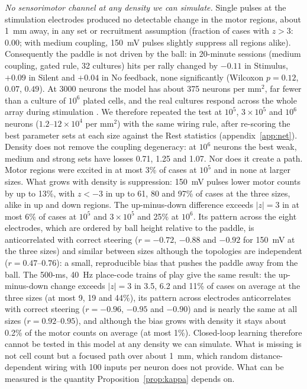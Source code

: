\documentclass[12pt]{article}
\numberwithin{equation}{section}
\begin{document}
\emph{No sensorimotor channel at any density we can simulate.} Single pulses at the stimulation electrodes produced no detectable change in the motor regions, about 1~mm away, in any set or recruitment assumption (fraction of cases with $z>3$: 0.00; with medium coupling, 150~mV pulses slightly suppress all regions alike). Consequently the paddle is not driven by the ball: in 20-minute sessions (medium coupling, gated rule, 32 cultures) hits per rally changed by $-0.11$ in Stimulus, $+0.09$ in Silent and $+0.04$ in No feedback, none significantly (Wilcoxon $p=0.12$, $0.07$, $0.49$). At 3000 neurons the model has about 375 neurons per mm$^2$, far fewer than a culture of $10^6$ plated cells, and the real cultures respond across the whole array during stimulation \citep[Fig.~4C]{Kagan2022}. We therefore repeated the test at $10^5$, $3\times10^5$ and $10^6$ neurons ($1.2$--$12\times10^4$ per mm$^2$) with the same wiring rule, after re-scoring the best parameter sets at each size against the Rest statistics (appendix~\ref{app:net}). Density does not remove the coupling degeneracy: at $10^6$ neurons the best weak, medium and strong sets have losses 0.71, 1.25 and 1.07. Nor does it create a path. Motor regions were excited in at most 3\% of cases at $10^5$ and in none at larger sizes. What grows with density is suppression: 150~mV pulses lower motor counts by up to 13\%, with $z<-3$ in up to 61, 80 and 97\% of cases at the three sizes, alike in up and down regions. The up-minus-down difference exceeds $|z|=3$ in at most 6\% of cases at $10^5$ and $3\times10^5$ and 25\% at $10^6$. Its pattern across the eight electrodes, which are ordered by ball height relative to the paddle, is anticorrelated with correct steering ($r=-0.72$, $-0.88$ and $-0.92$ for 150~mV at the three sizes) and similar between sizes although the topologies are independent ($r=0.47$--$0.76$): a small, reproducible bias that pushes the paddle away from the ball. The 500-ms, 40~Hz place-code trains of play give the same result: the up-minus-down change exceeds $|z|=3$ in 3.5, 6.2 and 11\% of cases on average at the three sizes (at most 9, 19 and 44\%), its pattern across electrodes anticorrelates with correct steering ($r=-0.96$, $-0.95$ and $-0.90$) and is nearly the same at all sizes ($r=0.92$--$0.95$), and although the bias grows with density it stays about 0.2\% of the motor counts on average (at most 1\%). Closed-loop learning therefore cannot be tested in this model at any density we can simulate. What is missing is not cell count but a focused path over about 1~mm, which random distance-dependent wiring with 100 inputs per neuron does not provide. What can be measured is the quantity Proposition~\ref{prop:kappa} depends on.
\end{document}
